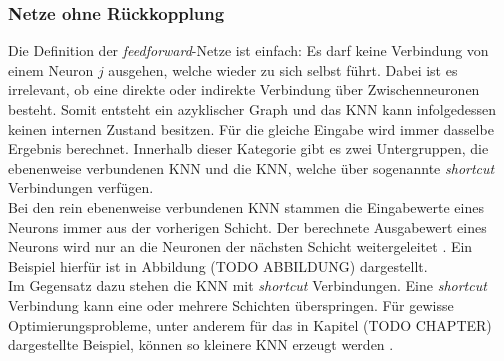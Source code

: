 \subsubsection{Netze ohne Rückkopplung} %
Die Definition der \emph{feedforward}-Netze ist einfach: Es darf keine Verbindung von einem Neuron $j$ ausgehen, welche wieder zu sich selbst führt. Dabei ist es irrelevant, ob eine direkte oder indirekte Verbindung über Zwischenneuronen besteht. Somit entsteht ein azyklischer Graph \cite{zell2003simulation} und das \ac{KNN} kann infolgedessen keinen internen Zustand besitzen. Für die gleiche Eingabe wird immer dasselbe Ergebnis berechnet. Innerhalb dieser Kategorie gibt es zwei Untergruppen, die ebenenweise verbundenen \ac{KNN} und die \ac{KNN}, welche über sogenannte \emph{shortcut} Verbindungen verfügen.\\
Bei den rein ebenenweise verbundenen \ac{KNN} stammen die Eingabewerte eines Neurons immer aus der vorherigen Schicht. Der berechnete Ausgabewert eines Neurons wird nur an die Neuronen der nächsten Schicht weitergeleitet \cite{zell2003simulation}. Ein Beispiel hierfür ist in Abbildung (TODO ABBILDUNG) dargestellt.\\ %
Im Gegensatz dazu stehen die \ac{KNN} mit \emph{shortcut} Verbindungen. Eine \emph{shortcut} Verbindung kann eine oder mehrere Schichten überspringen. Für gewisse Optimierungsprobleme, unter anderem für das in Kapitel (TODO CHAPTER) dargestellte Beispiel, können so kleinere \ac{KNN} erzeugt werden \cite{zell2003simulation}. 

